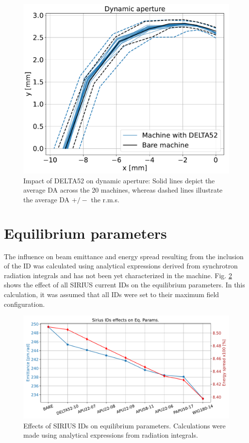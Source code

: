 \documentclass[a4paper,
               keeplastbox,   %
               ]{jacow}
\begin{document}
\begin{figure}[]
    \centering
   \includegraphics[width=0.6\columnwidth]{THPS18_f6.pdf}
   \caption{Impact of DELTA52 on dynamic aperture: Solid lines depict the average  DA across the 20 machines, whereas dashed lines illustrate the average DA $+/-$ the r.m.s.}
   \label{fig:dynapt}
\end{figure}

\section{Equilibrium parameters}
The influence on beam emittance and energy spread resulting from the inclusion of the ID was calculated using analytical expressions derived from synchrotron radiation integrals \cite{Lee:1999} and has not been yet characterized in the machine. Fig. \ref{fig:eq_param} shows the effect of all SIRIUS current IDs on the equilibrium parameters. In this calculation, it was assumed that all IDs were set to their maximum field configuration.

\begin{figure}[]
    \centering
   \includegraphics[width=.9\columnwidth]{THPS18_f7.pdf}
   \caption{Effects of SIRIUS IDs on equilibrium parameters. Calculations were made using analytical expressions from radiation integrals.}
   \label{fig:eq_param}
\end{figure}
\end{document}
